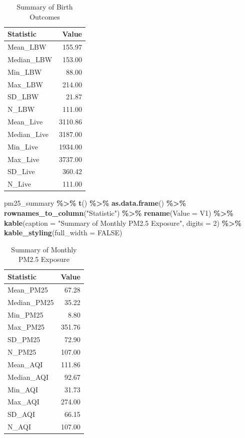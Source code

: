 \documentclass[
]{article}
\newenvironment{Shaded}{\begin{snugshade}}{\end{snugshade}}
\newcommand{\AttributeTok}[1]{\textcolor[rgb]{0.13,0.29,0.53}{#1}}
\newcommand{\ConstantTok}[1]{\textcolor[rgb]{0.56,0.35,0.01}{#1}}
\newcommand{\DecValTok}[1]{\textcolor[rgb]{0.00,0.00,0.81}{#1}}
\newcommand{\FunctionTok}[1]{\textcolor[rgb]{0.13,0.29,0.53}{\textbf{#1}}}
\newcommand{\NormalTok}[1]{#1}
\newcommand{\SpecialCharTok}[1]{\textcolor[rgb]{0.81,0.36,0.00}{\textbf{#1}}}
\newcommand{\StringTok}[1]{\textcolor[rgb]{0.31,0.60,0.02}{#1}}
\begin{document}
\begin{longtable}[t]{lr}
\caption{\label{tab:summary-statistics}Summary of Birth Outcomes}\\
\toprule
Statistic & Value\\
\midrule
Mean\_LBW & 155.97\\
Median\_LBW & 153.00\\
Min\_LBW & 88.00\\
Max\_LBW & 214.00\\
SD\_LBW & 21.87\\
\addlinespace
N\_LBW & 111.00\\
Mean\_Live & 3110.86\\
Median\_Live & 3187.00\\
Min\_Live & 1934.00\\
Max\_Live & 3737.00\\
\addlinespace
SD\_Live & 360.42\\
N\_Live & 111.00\\
\bottomrule
\end{longtable}

\begin{Shaded}
\begin{Highlighting}[]
\NormalTok{pm25\_summary }\SpecialCharTok{\%\textgreater{}\%}
  \FunctionTok{t}\NormalTok{() }\SpecialCharTok{\%\textgreater{}\%} \FunctionTok{as.data.frame}\NormalTok{() }\SpecialCharTok{\%\textgreater{}\%}
  \FunctionTok{rownames\_to\_column}\NormalTok{(}\StringTok{"Statistic"}\NormalTok{) }\SpecialCharTok{\%\textgreater{}\%}
  \FunctionTok{rename}\NormalTok{(}\AttributeTok{Value =}\NormalTok{ V1) }\SpecialCharTok{\%\textgreater{}\%}
  \FunctionTok{kable}\NormalTok{(}\AttributeTok{caption =} \StringTok{"Summary of Monthly PM2.5 Exposure"}\NormalTok{, }\AttributeTok{digits =} \DecValTok{2}\NormalTok{) }\SpecialCharTok{\%\textgreater{}\%}
  \FunctionTok{kable\_styling}\NormalTok{(}\AttributeTok{full\_width =} \ConstantTok{FALSE}\NormalTok{)}
\end{Highlighting}
\end{Shaded}

\begin{longtable}[t]{lr}
\caption{\label{tab:summary-statistics}Summary of Monthly PM2.5 Exposure}\\
\toprule
Statistic & Value\\
\midrule
Mean\_PM25 & 67.28\\
Median\_PM25 & 35.22\\
Min\_PM25 & 8.80\\
Max\_PM25 & 351.76\\
SD\_PM25 & 72.90\\
\addlinespace
N\_PM25 & 107.00\\
Mean\_AQI & 111.86\\
Median\_AQI & 92.67\\
Min\_AQI & 31.73\\
Max\_AQI & 274.00\\
\addlinespace
SD\_AQI & 66.15\\
N\_AQI & 107.00\\
\bottomrule
\end{longtable}
\end{document}
